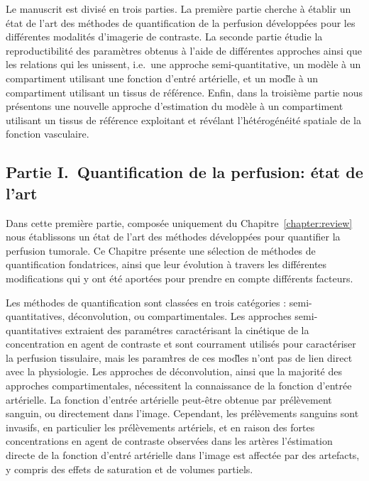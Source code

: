 \begin{otherlanguage}{francais}
Le manuscrit est divis\'e en trois parties.
La premi\`ere partie cherche \`a \'etablir un \'etat de l'art des m\'ethodes de quantification de la perfusion d\'evelopp\'ees pour les diff\'erentes modalit\'es d'imagerie de contraste.
La seconde partie \'etudie la reproductibilit\'e des param\`etres obtenus \`a l'aide de diff\'erentes approches ainsi que les relations qui les unissent, i.e.~une approche semi-quantitative, un mod\`ele \`a un compartiment utilisant une fonction d'entr\'e art\'erielle, et un mod\`le \`a un compartiment utilisant un tissus de r\'ef\'erence.
Enfin, dans la troisi\`eme partie nous pr\'esentons une nouvelle approche d'estimation du mod\`ele \`a un compartiment utilisant un tissus de r\'ef\'erence exploitant et r\'ev\'elant l'h\'et\'erog\'en\'eit\'e spatiale de la fonction vasculaire.

\subsection*{Partie I.~Quantification de la perfusion: \'etat de l'art}
Dans cette premi\`ere partie, compos\'ee uniquement du Chapitre~\ref{chapter:review} nous \'etablissons un \'etat de l'art des m\'ethodes d\'evelopp\'ees pour quantifier la perfusion tumorale.
Ce Chapitre pr\'esente une s\'election de m\'ethodes de quantification fondatrices, ainsi que leur \'evolution \`a travers les diff\'erentes modifications qui y ont \'et\'e aport\'ees pour prendre en compte diff\'erents facteurs. 

Les m\'ethodes de quantification sont class\'ees en trois cat\'egories : semi-quantitatives, d\'econvolution, ou compartimentales.
Les approches semi-quantitatives extraient des param\'etres caract\'erisant la cin\'etique de la concentration en agent de contraste et sont courrament utilis\'es pour caract\'eriser la perfusion tissulaire, mais les param\`tres de ces mod\`les n'ont pas de lien direct avec la physiologie.
Les approches de d\'econvolution, ainsi que la majorit\'e des approches compartimentales, n\'ecessitent la connaissance de la fonction d'entr\'ee art\'erielle.
La fonction d'entr\'ee art\'erielle peut-\^etre obtenue par pr\'el\`evement sanguin, ou directement dans l'image. 
Cependant, les pr\'el\`evements sanguins sont invasifs, en particulier les pr\'el\`evements art\'eriels, et en raison des fortes concentrations en agent de contraste observ\'ees dans les art\`eres l'\'estimation directe de la fonction d'entr\'e art\'erielle dans l'image est affect\'ee par des artefacts, y compris des effets de saturation et de volumes partiels.


\end{otherlanguage}
